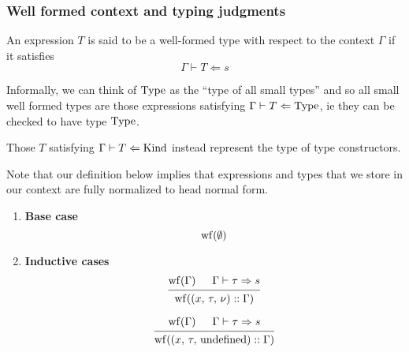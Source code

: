 \documentclass{article}
\begin{document}
\subsubsection{Well formed context and typing judgments}
\begin{definition} 
  An expression $T$ is said to be a well-formed type with respect to the context
  $\Gamma$ if it satisfies
  \[ \Gamma \vdash T \Leftarrow s \]

  Informally, we can think of $\operatorname{Type}$ as the ``type of all small types'' and so
  all small well formed types are those expressions satisfying
  $\Gamma \vdash T \Leftarrow \operatorname{Type}$, ie they can be checked to have type $\operatorname{Type}$.

  Those $T$ satisfying $\Gamma \vdash T \Leftarrow \operatorname{Kind}$ instead represent the
  type of type constructors. 
\end{definition}

\begin{definition} 
  Note that our definition below implies that expressions and types that we
  store in our context are fully normalized to head normal form.

  \begin{enumerate}
  \item \textbf{Base case} \\
    \[
      \begin{prooftree}
        \hypo{\wf(\emptyset)}
      \end{prooftree}
    \]

  \item \textbf{Inductive cases} \\
    \[
      \begin{prooftree}
        \hypo{\wf(\Gamma)}
        \hypo{\Gamma \vdash \tau \Rightarrow s}
        \infer2{\wf ((x, \, \tau, \, \nu) :: \Gamma)}
      \end{prooftree}
    \]

    \[
      \begin{prooftree}
        \hypo{\wf(\Gamma)}
        \hypo{\Gamma \vdash \tau \Rightarrow s}
        \infer2{\wf ((x, \, \tau, \, \text{undefined}) :: \Gamma)}
      \end{prooftree}
    \]
  \end{enumerate}
\end{definition}
\end{document}
